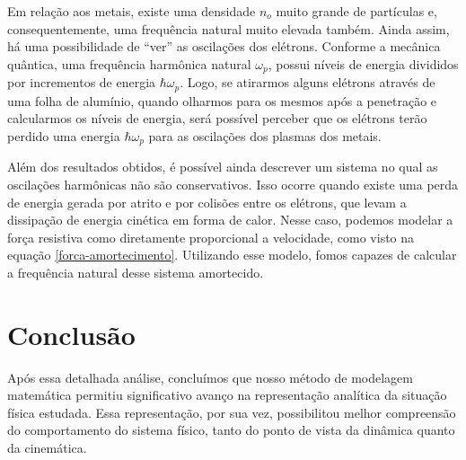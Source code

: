 \documentclass[
	article,
	11pt,
	oneside,
	a4paper,
	english,
	brazil,
	sumario=tradicional
	]{abntex2}
\begin{document}
 Em relação aos metais, existe uma densidade $n_o$ muito grande de partículas e, consequentemente, uma frequência natural muito elevada também. Ainda assim, há uma possibilidade de ``ver'' as oscilações dos elétrons. Conforme a mecânica quântica, uma frequência harmônica natural $\omega_p$, possui níveis de energia divididos por incrementos de energia $\hbar\omega_p$. Logo, se atirarmos alguns elétrons através de uma folha de alumínio, quando olharmos para os mesmos após a penetração e calcularmos os níveis de energia, será possível perceber que os elétrons terão perdido uma energia $\hbar\omega_p$ para as oscilações dos plasmas dos metais.

Além dos resultados obtidos, é possível ainda descrever um sistema no qual as oscilações harmônicas não são conservativos. Isso ocorre quando existe uma perda de energia gerada por atrito e por colisões entre os elétrons, que levam a dissipação de energia cinética em forma de calor. Nesse caso, podemos modelar a força resistiva como diretamente proporcional a velocidade, como visto na equação \ref{forca-amortecimento}. Utilizando esse modelo, fomos capazes de calcular a frequência natural desse sistema amortecido.

\section{Conclusão}

Após essa detalhada análise, concluímos que nosso método de modelagem matemática permitiu significativo avanço na representação analítica da situação física estudada. Essa representação, por sua vez, possibilitou melhor compreensão do comportamento do sistema físico, tanto do ponto de vista da dinâmica quanto da cinemática.

\nocite{feynman_leighton_sands_2009, halliday_resnick_walker_2008, mazur_et_al_2016}

\pagebreak
\onecolumn{
\postextual

}
\end{document}
